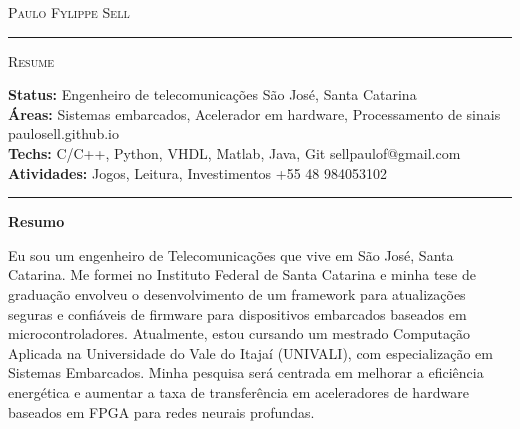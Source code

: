 \documentclass[10pt,A4]{article}
\newcommand{\cvsection}[1]
{
	\begin{center}
		\large\textcolor{sectcol}{\textbf{#1}}
	\end{center}
}
\newcommand{\metasection}[2]
{
\footnotesize{#2} \hspace*{\fill} \footnotesize{#1}\\[1pt]
}
\begin{document}
\pagestyle{fancy}	








\vspace{-8pt}
\begin{center}
	\HUGE \textsc{Paulo Fylippe Sell} \textcolor{sectcol}{\rule[-1mm]{1mm}{0.9cm}} \textsc{Resume}\\[2pt]
	
\end{center}



\vspace{6pt}


\metasection{São José, Santa Catarina}{\textbf{Status:} Engenheiro de telecomunicações}
\metasection{paulosell.github.io}{\textbf{Áreas:} 
Sistemas embarcados, Acelerador em hardware, Processamento de sinais}
\metasection{sellpaulof@gmail.com}{\textbf{Techs:} C/C++, Python, VHDL, Matlab, Java, Git}
\metasection{+55 48 984053102}{\textbf{Atividades:} Jogos, Leitura, Investimentos}
\vspace{-2pt}
\textcolor{softcol}{\hrule}
\vspace{6pt}

\normalsize

\vspace{-6pt}
\cvsection{Resumo}
Eu sou um engenheiro de Telecomunicações que vive em São José, Santa Catarina. Me formei no Instituto Federal de Santa Catarina e minha tese de graduação envolveu o desenvolvimento de um framework para atualizações seguras e confiáveis de firmware para dispositivos embarcados baseados em microcontroladores. Atualmente, estou cursando um mestrado Computação Aplicada na Universidade do Vale do Itajaí (UNIVALI), com especialização em Sistemas Embarcados. Minha pesquisa será centrada em melhorar a eficiência energética e aumentar a taxa de transferência em aceleradores de hardware baseados em FPGA para redes neurais profundas.\\
\end{document}
